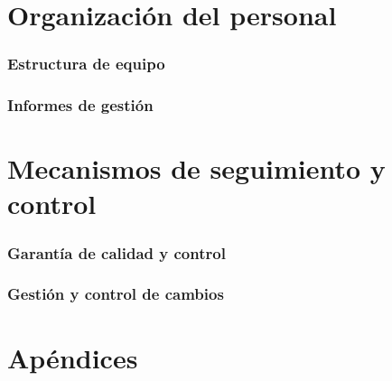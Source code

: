 \documentclass[spanish,a4paper,12pt]{report}	%
\begin{document}
\part{Organización del personal}

	\section{Estructura de equipo}

	\section{Informes de gestión}

\newpage
\mbox{}
\thispagestyle{empty}						%
\newpage
\setcounter{section}{0}


\part{Mecanismos de seguimiento y control}

	\section{Garantía de calidad y control}

	\section{Gestión y control de cambios}

\newpage
\mbox{}
\thispagestyle{empty}						%
\newpage
\setcounter{section}{0}
\part{Apéndices}


\newpage
\mbox{}
\thispagestyle{empty}						%
\newpage
\end{document}
